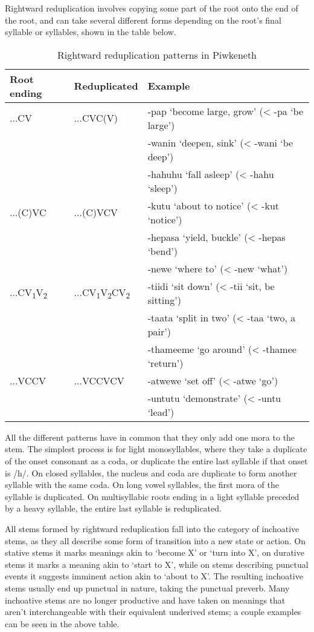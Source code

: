 \documentclass[smallroyalvopaper,9pt]{memoir} %
\newcommand{\lang}{Piwkeneth}
\newcommand{\tsub}[1]{\textsubscript{#1}}
\begin{document}
Rightward reduplication involves copying some part of the root onto the end of the root, and can take several different forms depending on the root's final syllable or syllables, shown in the table below.

\begin{table}[ht]
    \centering
    \begin{tabular}{lll}
        \toprule
        Root ending & Reduplicated & Example \\
        \midrule
        ...CV & ...CVC(V)& -pap `become large, grow' (< -pa `be large') \\
              &         & -wanin `deepen, sink' (< -wani `be deep') \\
              &         & -hahuhu `fall asleep' (< -hahu `sleep') \\
        ...(C)VC & ...(C)VCV  & -kutu `about to notice' (< -kut `notice') \\
              &         & -hepasa `yield, buckle' (< -hepas `bend') \\
              &         & -newe `where to' (< -new `what') \\
        ...CV\tsub{1}V\tsub{2} & ...CV\tsub{1}V\tsub{2}CV\tsub{2} & -tiidi `sit down' (< -tii `sit, be sitting') \\
              &         & -taata `split in two' (< -taa `two, a pair') \\
              &         & -thameeme `go around' (< -thamee `return') \\
        ...VCCV & ...VCCVCV & -atwewe `set off' (< -atwe `go') \\
              &         & -untutu `demonstrate' (< -untu `lead') \\
        \bottomrule
    \end{tabular}
    \caption{Rightward reduplication patterns in \lang}
\end{table}

All the different patterns have in common that they only add one mora to the stem. The simplest process is for light monosyllables, where they take a duplicate of the onset consonant as a coda, or duplicate the entire last syllable if that onset is /h/. On closed syllables, the nucleus and coda are duplicate to form another syllable with the same coda. On long vowel syllables, the first mora of the syllable is duplicated. On multisyllabic roots ending in a light syllable preceded by a heavy syllable, the entire last syllable is reduplicated.

All stems formed by rightward reduplication fall into the category of inchoative stems, as they all describe some form of transition into a new state or action. On stative stems it marks meanings akin to `become X' or `turn into X', on durative stems it marks a meaning akin to `start to X', while on stems describing punctual events it suggests imminent action akin to `about to X'. The resulting inchoative stems usually end up punctual in nature, taking the punctual preverb. Many inchoative stems are no longer productive and have taken on meanings that aren't interchangeable with their equivalent underived stems; a couple examples can be seen in the above table.
\end{document}
